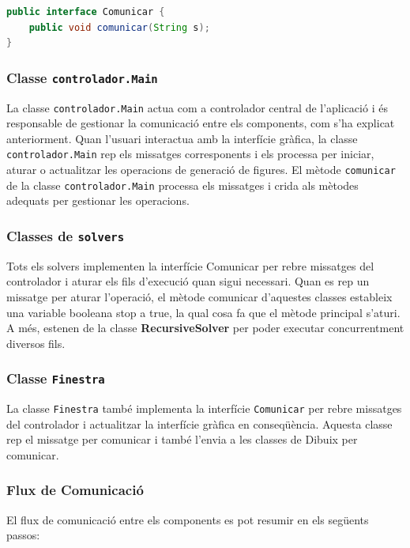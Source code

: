 \documentclass{ieeetj}
\begin{document}
\begin{lstlisting}[language=Java, basicstyle=\ttfamily\small]
public interface Comunicar {
    public void comunicar(String s);
}
\end{lstlisting}

\subsubsection{Classe \texttt{controlador.Main}}
La classe \texttt{controlador.Main} actua com a controlador central de l'aplicació i és responsable de gestionar la comunicació entre els components, com s'ha explicat anteriorment. Quan l'usuari interactua amb la interfície gràfica, la classe \texttt{controlador.Main} rep els missatges corresponents i els processa per iniciar, aturar o actualitzar les operacions de generació de figures. El mètode \texttt{comunicar} de la classe \texttt{controlador.Main} processa els missatges i crida als mètodes adequats per gestionar les operacions.

\subsubsection{Classes de \texttt{solvers}}
Tots els solvers implementen la interfície Comunicar per rebre missatges del controlador i aturar els fils d'execució quan sigui necessari. Quan es rep un missatge per aturar l’operació, el mètode comunicar d’aquestes classes estableix una variable booleana stop a true, la qual cosa fa que el mètode principal  s’aturi.
A més, estenen de la classe \textbf{RecursiveSolver} per poder executar concurrentment diversos fils.

\subsubsection{Classe \texttt{Finestra}}
La classe \texttt{Finestra} també implementa la interfície \texttt{Comunicar} per rebre missatges del controlador i actualitzar la interfície gràfica en conseqüència. Aquesta classe rep el missatge per comunicar i també l'envia a les classes de Dibuix per comunicar.
\subsubsection{Flux de Comunicació}
El flux de comunicació entre els components es pot resumir en els següents passos:
\end{document}
